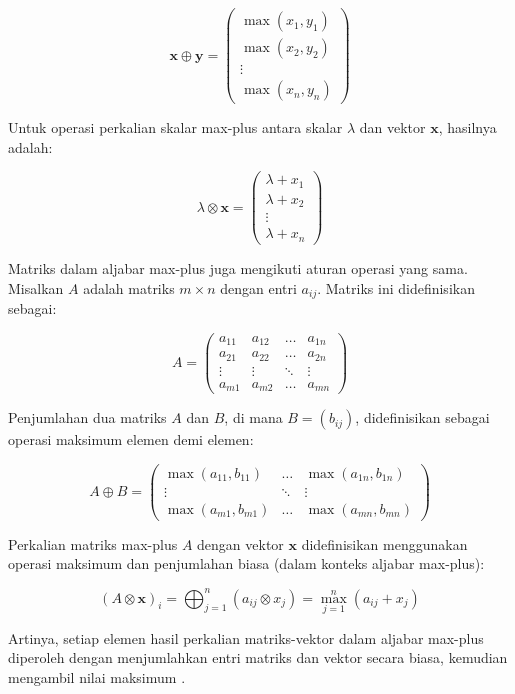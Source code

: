 \documentclass[12pt]{article}
\numberwithin{lemma}{subsection}
\begin{document}
\[
\mathbf{x} \oplus \mathbf{y} = \begin{pmatrix} \max(x_1, y_1) \\ \max(x_2, y_2) \\ \vdots \\ \max(x_n, y_n) \end{pmatrix}
\]

Untuk operasi perkalian skalar max-plus antara skalar \( \lambda \) dan vektor \( \mathbf{x} \), hasilnya adalah:

\[
\lambda \otimes \mathbf{x} = \begin{pmatrix} \lambda + x_1 \\ \lambda + x_2 \\ \vdots \\ \lambda + x_n \end{pmatrix}
\]

Matriks dalam aljabar max-plus juga mengikuti aturan operasi yang sama. Misalkan \( A \) adalah matriks \( m \times n \) dengan entri \( a_{ij} \). Matriks ini didefinisikan sebagai:

\[
A = \begin{pmatrix} a_{11} & a_{12} & \dots & a_{1n} \\ a_{21} & a_{22} & \dots & a_{2n} \\ \vdots & \vdots & \ddots & \vdots \\ a_{m1} & a_{m2} & \dots & a_{mn} \end{pmatrix}
\]

Penjumlahan dua matriks \( A \) dan \( B \), di mana \( B = (b_{ij}) \), didefinisikan sebagai operasi maksimum elemen demi elemen:

\[
A \oplus B = \begin{pmatrix} \max(a_{11}, b_{11}) & \dots & \max(a_{1n}, b_{1n}) \\ \vdots & \ddots & \vdots \\ \max(a_{m1}, b_{m1}) & \dots & \max(a_{mn}, b_{mn}) \end{pmatrix}
\]

Perkalian matriks max-plus \( A \) dengan vektor \( \mathbf{x} \) didefinisikan menggunakan operasi maksimum dan penjumlahan biasa (dalam konteks aljabar max-plus):

\[
(A \otimes \mathbf{x})_i = \bigoplus_{j=1}^n (a_{ij} \otimes x_j) = \max_{j=1}^n (a_{ij} + x_j)
\]

Artinya, setiap elemen hasil perkalian matriks-vektor dalam aljabar max-plus diperoleh dengan menjumlahkan entri matriks dan vektor secara biasa, kemudian mengambil nilai maksimum \citep{subionopower}.
\end{document}
